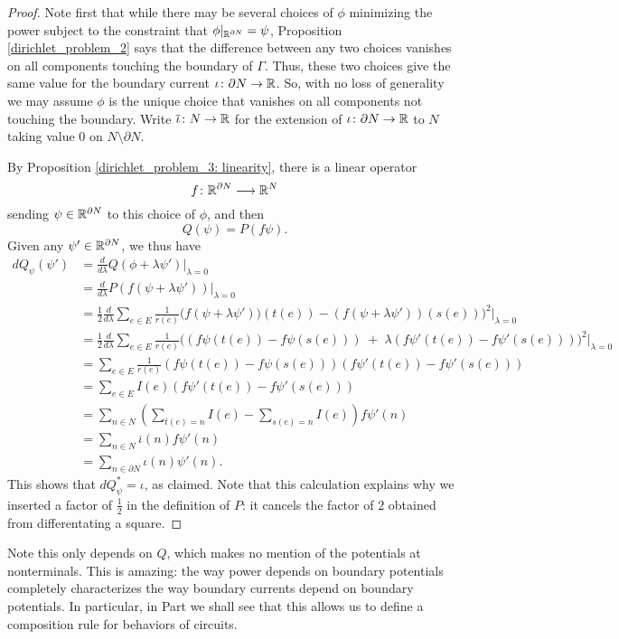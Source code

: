 \begin{proof}
Note first that while there may be several choices of $\phi$ minimizing the power subject to the constraint that $\phi|_{{\mathbb{R}}^{\partial N}} = \psi$, Proposition \ref{dirichlet_problem_2} says that the difference between any two choices vanishes on all components touching the boundary of $\Gamma$.  Thus, these two choices give the same value for the boundary current $\iota{\colon} \partial N \to {\mathbb{R}}$. So, with no loss of generality we may assume $\phi$ is the unique choice that vanishes on all components not touching the boundary. Write $\overline\iota{\colon} N \to {\mathbb{R}}$ for the extension of $\iota{\colon} \partial N \to {\mathbb{R}}$ to $N$ taking value $0$ on $N \setminus \partial N$. 

By Proposition \ref{dirichlet_problem_3: linearity}, there is a linear operator
\[
f{\colon} {\mathbb{R}}^{\partial N} \longrightarrow {\mathbb{R}}^N
\]
sending $\psi \in {\mathbb{R}}^{\partial N}$ to this choice of $\phi$, and then
\[
Q(\psi) = P(f\psi).
\]
Given any $\psi' \in {\mathbb{R}}^{\partial N}$, we thus have
\begin{align*}
dQ_\psi(\psi') &= \frac{d}{d\lambda}Q(\phi +\lambda\psi') \bigg|_{\lambda=0} \\
&= \frac{d}{d\lambda}P(f(\psi+\lambda\psi'))\bigg|_{\lambda=0} \\
&= \frac{1}{2} \frac{d}{d\lambda}\sum_{e \in E} \frac1{r(e)}\bigg(f(\psi+\lambda\psi'))(t(e))-(f(\psi+\lambda\psi'))(s(e))\bigg)^2 \bigg|_{\lambda=0} \\
&= \frac{1}{2} \frac{d}{d\lambda}\sum_{e \in E} \frac1{r(e)}\bigg((f\psi(t(e))-f\psi(s(e))) \;+\;\lambda (f\psi'(t(e))- f\psi'(s(e)))\bigg)^2 \bigg|_{\lambda=0} \\
&= \sum_{e \in E} \frac1{r(e)}(f\psi(t(e))-f\psi(s(e)))(f\psi'(t(e))- f\psi'(s(e))) \\
&= \sum_{e \in E} I(e)(f\psi'(t(e))- f\psi'(s(e))) \\
&= \sum_{n \in N}\left(\sum_{t(e) = n} I(e) - \sum_{s(e) = n} I(e)\right)f\psi'(n) \\
&= \sum_{n \in N}\overline \iota(n) f\psi'(n) \\
&= \sum_{n \in \partial N}\iota(n) \psi'(n).
\end{align*}
This shows that $dQ_\psi^\ast = \iota$, as claimed.  Note that this calculation explains why we inserted a factor of $\frac{1}{2}$ in the definition of $P$: it cancels the factor of $2$ obtained from differentating a square.
 \end{proof}

Note this only depends on $Q$, which makes no mention of the potentials at
nonterminals. This is amazing: the way power depends on boundary potentials
completely characterizes the way boundary currents depend on boundary
potentials. In particular, in Part  we shall see that this
allows us to define a composition rule for behaviors of circuits.

